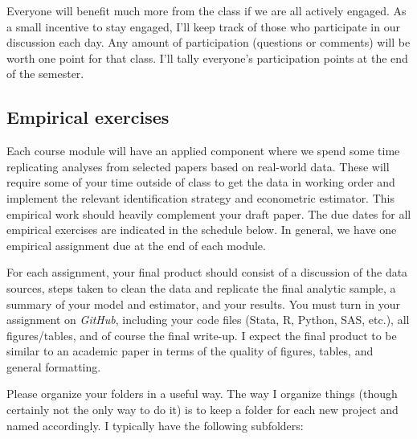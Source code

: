 \documentclass[11pt,]{article}
\begin{document}
Everyone will benefit much more from the class if we are all actively
engaged. As a small incentive to stay engaged, I'll keep track of those
who participate in our discussion each day. Any amount of participation
(questions or comments) will be worth one point for that class. I'll
tally everyone's participation points at the end of the semester.

\hypertarget{empirical-exercises}{%
\subsection{Empirical exercises}\label{empirical-exercises}}

Each course module will have an applied component where we spend some
time replicating analyses from selected papers based on real-world data.
These will require some of your time outside of class to get the data in
working order and implement the relevant identification strategy and
econometric estimator. This empirical work should heavily complement
your draft paper. The due dates for all empirical exercises are
indicated in the schedule below. In general, we have one empirical
assignment due at the end of each module.

For each assignment, your final product should consist of a discussion
of the data sources, steps taken to clean the data and replicate the
final analytic sample, a summary of your model and estimator, and your
results. You must turn in your assignment on \emph{GitHub}, including
your code files (Stata, R, Python, SAS, etc.), all figures/tables, and
of course the final write-up. I expect the final product to be similar
to an academic paper in terms of the quality of figures, tables, and
general formatting.

Please organize your folders in a useful way. The way I organize things
(though certainly not the only way to do it) is to keep a folder for
each new project and named accordingly. I typically have the following
subfolders:
\end{document}
